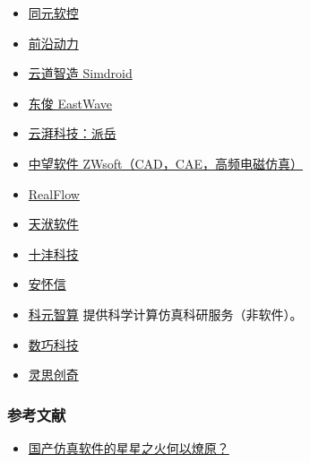 

\begin{issues}
\issueDraft
\end{issues}

\begin{itemize}
\item \href{https://www.tongyuan.cc/}{同元软控}
\item \href{http://www.adicn.com/}{前沿动力}
\item \href{https://www.ibe.cn/}{云道智造 Simdroid}
\item \href{https://www.eastfdtd.com/index.aspx}{东俊 EastWave}
\item \href{https://www.yunpaikeji.com.cn/cpfw}{云湃科技：派岳}
\item \href{https://www.zwsoft.cn/product/cae/waves}{中望软件 ZWsoft（CAD，CAE，高频电磁仿真）}
\item \href{https://www.realflow.com.cn/}{RealFlow}
\item \href{https://www.njtf.cn/}{天洑软件}
\item \href{https://www.tenfong.cn/}{十沣科技}
\item \href{http://www.anwiseglobal.cn/}{安怀信}
\item \href{https://www.keyuanzhisuan.com/}{科元智算} 提供科学计算仿真科研服务（非软件）。
\item \href{https://www.simright.com/zh/}{数巧科技}
\item \href{http://www.linkstech.com.cn/}{灵思创奇}
\end{itemize}

\subsubsection{参考文献}
\begin{itemize}
\item \href{https://m.e-works.net.cn/articles/article151824.htm}{国产仿真软件的星星之火何以燎原？}
\end{itemize}
